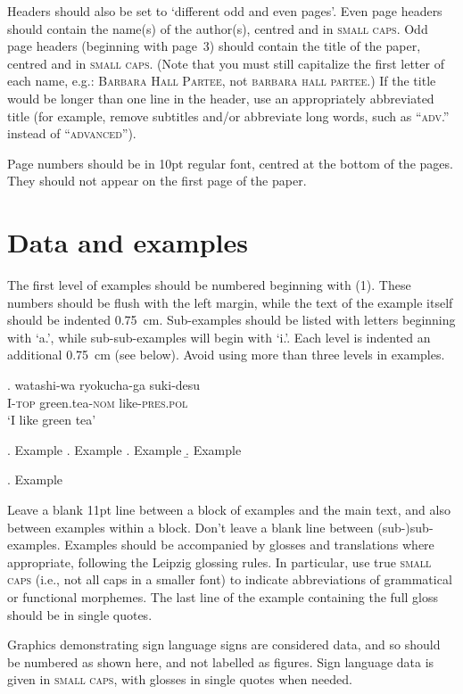 \documentclass[xelatex,linguex]{TWPL}
\begin{document}
Headers should also be set to `different odd and even pages'. Even page headers should contain the name(s) of the author(s), centred and in \textsc{small caps}. Odd page headers (beginning with page~3) should contain the title of the paper, centred and in \textsc{small caps}. (Note that you must still capitalize the first letter of each name, e.g.: \textsc{Barbara Hall Partee}, not \textsc{barbara hall partee}.) If the title would be longer than one line in the header, use an appropriately abbreviated title (for example, remove subtitles and/or abbreviate long words, such as ``\textsc{adv}.'' instead of ``\textsc{advanced}'').

Page numbers should be in 10pt regular font, centred at the bottom of the pages. They should not appear on the first page of the paper.

\section{Data and examples}

The first level of examples should be numbered beginning with (1). These numbers should be flush with the left margin, while the text of the example itself should be indented 0.75~cm. Sub-examples should be listed with letters beginning with `a.', while sub-sub-examples will begin with `i.'. Each level is indented an additional 0.75~cm (see below). Avoid using more than three levels in examples.

\exg. watashi-wa ryokucha-ga suki-desu\\
I-\textsc{top} green.tea-\textsc{nom} like-\textsc{pres.pol}\\
`I like green tea'

\ex. Example
\a. Example
\a. Example
\b. Example

\ex. Example

Leave a blank 11pt line between a block of examples and the main text, and also between examples within a block. Don't leave a blank line between (sub-)sub-examples. Examples should be accompanied by glosses and translations where appropriate, following the Leipzig glossing rules. In particular, use true \textsc{small caps} (i.e., not all caps in a smaller font) to indicate abbreviations of grammatical or functional morphemes. The last line of the example containing the full gloss should be in single quotes.

Graphics demonstrating sign language signs are considered data, and so should be numbered as shown here, and not labelled as figures. Sign language data is given in \textsc{small caps}, with glosses in single quotes when needed. 
\end{document}
